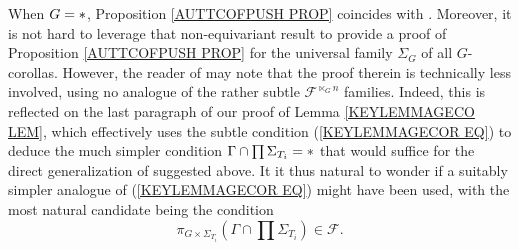 \documentclass[a4paper,10pt]{article}%
\begin{document}
\begin{remark}
  When $G=\**$, Proposition \ref{AUTTCOFPUSH PROP}
  coincides with \cite[Lemma 5.9]{BM08}.
  Moreover, it is not hard to leverage that non-equivariant result to provide a proof of Proposition \ref{AUTTCOFPUSH PROP} for the universal family $\Sigma_G$ of all $G$-corollas.
  However, the reader of \cite{BM08} may note that the proof therein is technically less involved, using no analogue of the rather subtle $\mathcal{F}^{\ltimes_G n}$ families.
  Indeed, this is reflected 
  on the last paragraph of our proof of Lemma \ref{KEYLEMMAGECO LEM}, which effectively 
  uses the subtle condition (\ref{KEYLEMMAGECOR EQ})
  to deduce the much simpler condition
  $\Gamma \cap \prod \Sigma_{T_i} = \**$
  that would suffice for the direct generalization of \cite[Lemma 5.9]{BM08} suggested above.
  It it thus natural to wonder if a suitably simpler analogue
  of (\ref{KEYLEMMAGECOR EQ}) might have been used, with the most natural candidate being the condition  
  \begin{equation}\label{WRONGCONJ}
    \pi_{G \times \Sigma_{T_i}}(\Gamma \cap \prod \Sigma_{T_i})
    \in   \mathcal{F}.
  \end{equation}


\end{remark}
\end{document}
